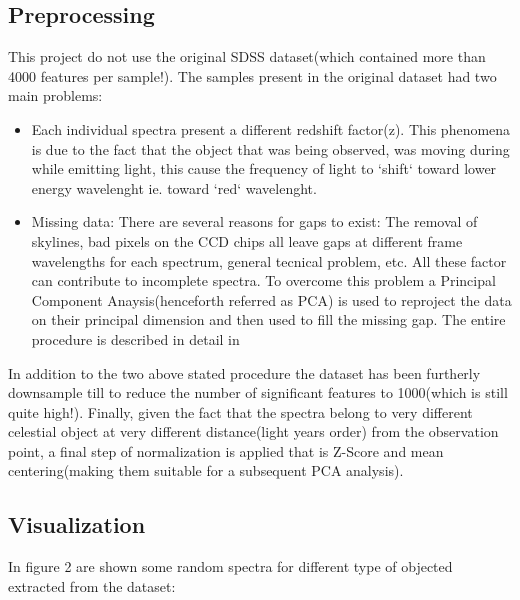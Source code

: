 \documentclass[a4paper,10pt]{article}
\begin{document}
  \subsection{Preprocessing}
    This project do not use the original SDSS dataset(which contained more than 4000 features per sample!).\newline
    The samples present in the original dataset had two main problems:
    \begin{itemize}
     \item Each individual spectra present a different redshift factor(z). This phenomena is due to the fact that 
	the object that was being observed, was moving during while emitting light, this cause the frequency of light
	to `shift` toward lower energy wavelenght ie. toward `red` wavelenght.
     
     \item Missing data: There are several reasons for gaps to exist: The removal of skylines,
	bad pixels on the CCD chips all leave gaps at different frame wavelengths for each spectrum, general tecnical problem, etc. 
	All these factor can contribute to incomplete spectra.\newline
	To overcome this problem a Principal Component Anaysis(henceforth referred as PCA) is used to reproject the data
	on their principal dimension and then used to fill the missing gap. The entire procedure is described in detail in \cite{redshift}
    \end{itemize}
    In addition to the two above stated procedure the dataset has been furtherly downsample till to reduce the number of significant features
    to 1000(which is still quite high!).\newline
    Finally, given the fact that the spectra belong to very different celestial object at very different distance(light years order) from 
    the observation point, a final step of normalization is applied that is Z-Score and mean centering(making them suitable for a subsequent PCA analysis).
  
  \subsection{Visualization}
    In figure 2 are shown some random spectra for different type of objected extracted from the dataset:
    
\end{document}
